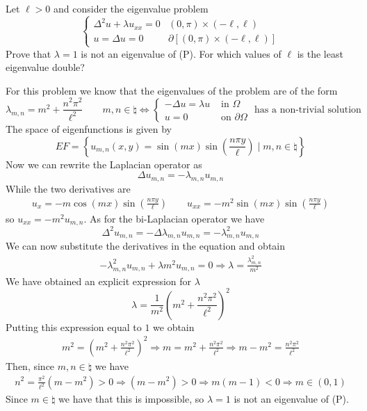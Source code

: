 \newpage
\begin{exercise}
    Let \(\ell > 0\) and consider the eigenvalue problem
    \[
        \begin{cases}
            \Delta^2 u + \lambda u_{xx} = 0 & (0, \pi) \times (-\ell, \ell)                      \\
            u =  \Delta u = 0               & \partial\left[(0, \pi) \times (-\ell, \ell)\right]
        \end{cases}
        \tag*{(P)}
    \]
    Prove that \(\lambda = 1\) is not an eigenvalue of (P). For which values of
    \(\ell\) is the least eigenvalue double?
\end{exercise}

For this problem we know that the eigenvalues of the problem are of the form
\[
    \lambda_{m,n} = m^2 +  \frac{n^2 \pi^2}{\ell^2} \qquad m, n \in \natural \iff \begin{cases}
        -\Delta u = \lambda u & \text{ in } \Omega         \\
        u = 0                 & \text{ on } \partial\Omega
    \end{cases} \text{ has a non-trivial solution}
\]
The space of eigenfunctions is given by
\[
    EF = \left\{ u_{m,n}(x, y) = \sin(mx) \sin\left(\frac{n \pi y}{\ell}\right) \mid m, n \in \natural \right\}
\]
Now we can rewrite the Laplacian operator as
\[
    \Delta u_{m,n} = - \lambda_{m,n} u_{m,n}
\]
While the two derivatives are
\[
    \begin{split}
        u_x = -m \cos(mx) \sin\left(\frac{n \pi y}{\ell}\right) \qquad u_{xx} = -m^2 \sin(mx) \sin\left(\frac{n \pi y}{\ell}\right)
    \end{split}
\]
so \(u_{xx} = -m^2 u_{m,n}\). As for the bi-Laplacian operator we have
\[
    \Delta^2 u_{m,n} = - \Delta \lambda_{m,n} u_{m,n} = - \lambda_{m,n}^2 u_{m,n}
\]
We can now substitute the derivatives in the equation and obtain
\[
    \begin{split}
        - \lambda_{m,n}^2 u_{m,n} + \lambda m^2 u_{m,n} = 0 \Rightarrow \lambda = \frac{\lambda_{m,n}^2}{m^2}
    \end{split}
\]
We have obtained an explicit expression for \(\lambda\)
\[
    \lambda = \frac{1}{m^2} \left(m^2 + \frac{n^2 \pi^2}{\ell^2}\right)^2
\]
Putting this expression equal to \(1\) we obtain
\[
    \begin{split}
        m^2 = \left(m^2 + \frac{n^2 \pi^2}{\ell^2}\right)^2 \Rightarrow  m = m^2 + \frac{n^2 \pi^2}{\ell^2} \Rightarrow m - m^2 = \frac{n^2 \pi^2}{\ell^2}
    \end{split}
\]
Then, since \(m, n \in \natural\) we have
\[
    \begin{split}
        n^2 = \frac{\pi^2}{\ell^2} \left(m - m^2\right) > 0 \Rightarrow (m - m^2) > 0 \Rightarrow m(m - 1) < 0 \Rightarrow m \in (0,1)
    \end{split}
\]
Since \(m \in \natural\) we have that this is impossible, so \(\lambda = 1\) is
not an eigenvalue of (P).

